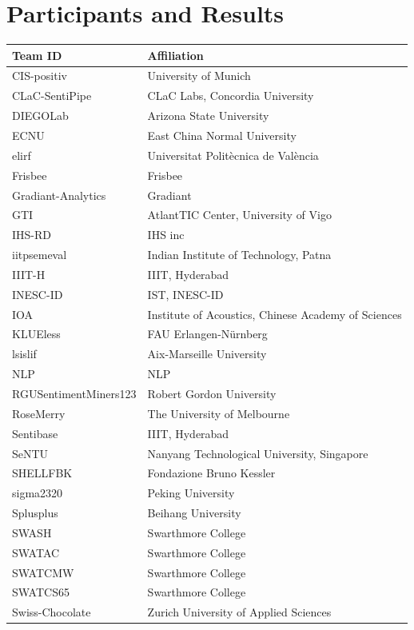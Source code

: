\documentclass[11pt]{article}
\begin{document}
\section{Participants and Results}


\begin{table}[t]
\begin{center}
\tiny{
\begin{tabular}{ll}
\bf Team ID & \bf Affiliation\\
\hline
CIS-positiv & University of Munich\\
CLaC-SentiPipe & CLaC Labs, Concordia University\\
DIEGOLab & Arizona State University\\
ECNU & East China Normal University\\
elirf & Universitat Polit\`{e}cnica de Val\`{e}ncia\\
Frisbee & Frisbee\\
Gradiant-Analytics & Gradiant\\
GTI & AtlantTIC Center, University of Vigo\\
IHS-RD & IHS inc\\
iitpsemeval & Indian Institute of Technology, Patna\\
IIIT-H & IIIT, Hyderabad\\
INESC-ID & IST, INESC-ID\\
IOA & Institute of Acoustics, Chinese Academy of Sciences\\
KLUEless & FAU Erlangen-N\"{u}rnberg\\
lsislif & Aix-Marseille University\\
NLP & NLP\\
RGUSentimentMiners123 & Robert Gordon University\\
RoseMerry & The University of Melbourne\\
Sentibase & IIIT, Hyderabad\\
SeNTU & Nanyang Technological University, Singapore\\
SHELLFBK & Fondazione Bruno Kessler\\
sigma2320 & Peking University\\
Splusplus & Beihang University\\
SWASH & Swarthmore College\\
SWATAC & Swarthmore College\\
SWATCMW & Swarthmore College\\
SWATCS65 & Swarthmore College\\
Swiss-Chocolate & Zurich University of Applied Sciences\\

\end{tabular}}
\end{center}
\end{table}
\end{document}
